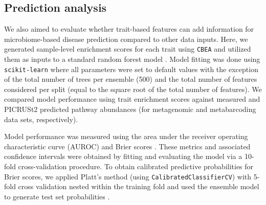 
\subsection{Prediction analysis}  

We also aimed to evaluate whether trait-based features can add information for microbiome-based disease prediction compared to other data inputs. Here, we generated sample-level enrichment scores for each trait using \texttt{CBEA} and utilized them as inputs to a standard random forest model \cite{breiman2001random}. Model fitting was done using \texttt{scikit-learn} \cite{scikit-learn} where all parameters were set to default values with the exception of the total number of trees per ensemble (500) and the total number of features considered per split (equal to the square root of the total number of features). We compared model performance using trait enrichment scores against measured and PICRUSt2 predicted pathway abundances (for metagenomic and metabarcoding data sets, respectively).

Model performance was measured using the area under the receiver operating characteristic curve (AUROC) and Brier scores \cite{brier1950verification}. These metrics and associated confidence intervals were obtained by fitting and evaluating the model via a 10-fold cross-validation procedure. To obtain calibrated predictive probabilities for Brier scores, we applied Platt's method (using \texttt{CalibratedClassifierCV}) with 5-fold cross validation nested within the training fold and used the ensemble model to generate test set probabilities \cite{Platt99probabilisticoutputs}.

